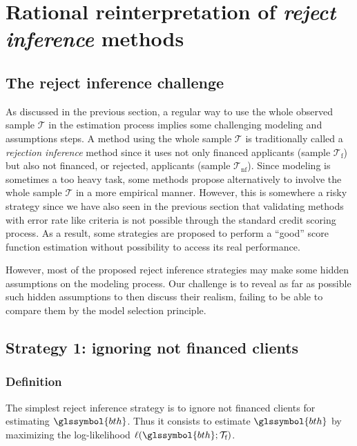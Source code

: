 \section{Rational reinterpretation of \textit{reject inference} methods} \label{sec:methods_reject}

\subsection{The reject inference challenge}

As discussed in the previous section, a regular way to use the whole observed sample $\mathcal{T}$ in the estimation process implies some challenging modeling and assumptions steps. A method using the whole sample $\mathcal{T}$ is traditionally called a {\it rejection inference} method since it uses not only financed applicants (sample $\mathcal{T}_\text{f}$) but also not financed, or rejected, applicants (sample $\mathcal{T}_{\text{nf}}$).
Since modeling is sometimes a too heavy task, some methods propose alternatively to involve the whole sample $\mathcal{T}$ in a more empirical manner. However, this is somewhere a risky strategy since we have also seen in the previous section that validating methods with error rate like criteria is not possible through the standard credit scoring process. As a result, some strategies are proposed to perform a ``good'' \gls{score} function estimation without possibility to access its real performance.

However, most of the proposed reject inference strategies may make some hidden assumptions on the modeling process. Our challenge is to reveal as far as possible such hidden assumptions to then discuss their realism,  
failing to be able to compare them by the model selection principle.

\subsection{Strategy 1: ignoring not financed clients} \label{subsec:no_reject}

\subsubsection{Definition}
The simplest reject inference strategy is to ignore not financed clients for estimating $\glssymbol{bth}$. Thus it consists to estimate $\glssymbol{bth}$ by maximizing the log-likelihood $\ell(\glssymbol{bth};\mathcal{T}_{\text{f}})$.

